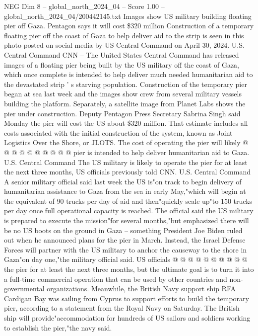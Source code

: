 \begin{textsample}{NEG Dim 8 – global\_north\_2024\_04 – Score 1.00 – global\_north\_2024\_04/200442145.txt}  \label{ex:f8_neg_406}
Images show US military building floating pier off Gaza.
Pentagon says it will cost \$320 million Construction of a temporary floating pier off the coast of Gaza to help deliver aid to the strip is seen in this photo posted on social media by US Central Command on April 30, 2024.
U.S.
Central Command CNN -- The United States Central Command has released images of a floating pier being built by the US military off the coast of Gaza, which once complete is intended to help deliver much needed humanitarian aid to the devastated strip ' s starving population.
Construction of the temporary pier began at sea last week and the images show crew from several military vessels building the platform.
Separately, a satellite image from Planet Labs shows the pier under construction.
Deputy Pentagon Press Secretary Sabrina Singh said Monday the pier will cost the US about \$320 million.
That estimate includes all costs associated with the initial construction of the system, known as Joint Logistics Over the Shore, or JLOTS.
The cost of operating the pier will likely @ @ @ @ @ @ @ @ @ @ pier is intended to help deliver humanitarian aid to Gaza.
U.S.
Central Command The US military is likely to operate the pier for at least the next three months, US officials previously told CNN.
U.S.
Central Command A senior military official said last week the US is"on track to begin delivery of humanitarian assistance to Gaza from the sea in early May,"which will begin at the equivalent of 90 trucks per day of aid and then"quickly scale up"to 150 trucks per day once full operational capacity is reached.
The official said the US military is prepared to execute the mission"for several months,"but emphasized there will be no US boots on the ground in Gaza -- something President Joe Biden ruled out when he announced plans for the pier in March.
Instead, the Israel Defense Forces will partner with the US military to anchor the causeway to the shore in Gaza"on day one,"the military official said.
US officials @ @ @ @ @ @ @ @ @ @ the pier for at least the next three months, but the ultimate goal is to turn it into a full-time commercial operation that can be used by other countries and non-governmental organizations.
Meanwhile, the British Navy support ship RFA Cardigan Bay was sailing from Cyprus to support efforts to build the temporary pier, according to a statement from the Royal Navy on Saturday.
The British ship will provide"accommodation for hundreds of US sailors and soldiers working to establish the pier,"the navy said.

\end{textsample}
